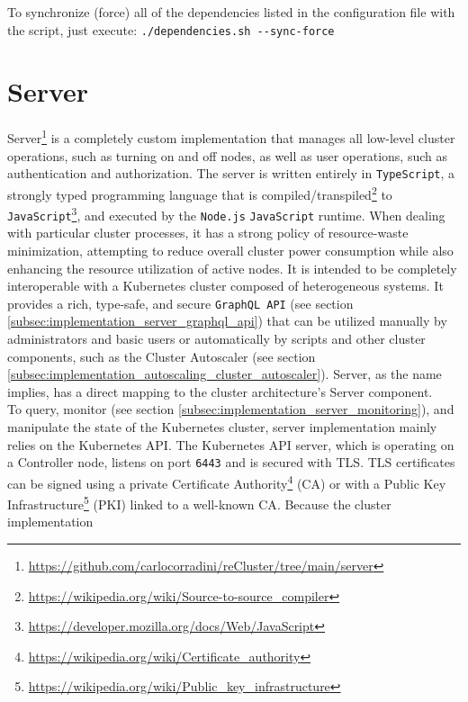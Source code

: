 To synchronize (force) all of the dependencies listed in the configuration file
with the script, just execute: \lstinline[language=shell, alsoletter={.-},
morekeywords={[2]{dependencies.sh}}, morekeywords={[3]{--sync-force}}]{./dependencies.sh --sync-force}

\section{Server}
\label{sec:implementation_server}

Server\footnote{\url{https://github.com/carlocorradini/reCluster/tree/main/server}}
is a completely custom implementation that manages all low-level cluster operations,
such as turning on and off nodes, as well as user operations, such as
authentication and authorization. The server is written entirely in \texttt{TypeScript},
a strongly typed programming language that is compiled/transpiled\footnote{\url{https://wikipedia.org/wiki/Source-to-source_compiler}}
to \texttt{JavaScript}\footnote{\url{https://developer.mozilla.org/docs/Web/JavaScript}}\cite{typescript},
and executed by the \texttt{Node.js} \texttt{JavaScript} runtime\cite{nodejs}.
When dealing with particular cluster processes, it has a strong policy of resource-waste
minimization, attempting to reduce overall cluster power consumption while also
enhancing the resource utilization of active nodes. It is intended to be completely
interoperable with a Kubernetes cluster composed of heterogeneous systems. It
provides a rich, type-safe, and secure \texttt{GraphQL API} (see section
\ref{subsec:implementation_server_graphql_api}) that can be utilized manually by
administrators and basic users or automatically by scripts and other cluster components,
such as the Cluster Autoscaler (see section \ref{subsec:implementation_autoscaling_cluster_autoscaler}).
Server, as the name implies, has a direct mapping to the cluster architecture's Server
component. \\ %
To query, monitor (see section \ref{subsec:implementation_server_monitoring}), and
manipulate the state of the Kubernetes cluster, server implementation mainly
relies on the Kubernetes API. The Kubernetes API server, which is operating on a
Controller node, listens on port \texttt{6443} and is secured with TLS. TLS certificates
can be signed using a private Certificate Authority\footnote{\url{https://wikipedia.org/wiki/Certificate_authority}}
(CA) or with a Public Key Infrastructure\footnote{\url{https://wikipedia.org/wiki/Public_key_infrastructure}}
(PKI) linked to a well-known CA\cite{k8s_api_access}. Because the cluster implementation
